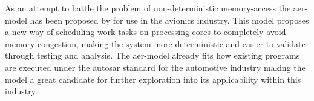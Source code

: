 \documentclass{kththesis}
\begin{document}

As an attempt to battle the problem of non-deterministic memory-access the \acrfull{aer}-model has
been proposed by \textcite{durrieu_predictable_2014} for use in the avionics industry. This model
proposes a new way of scheduling work-tasks on processing cores to completely avoid memory
congestion, making the system more deterministic and easier to validate through testing and
analysis. The \acrshort{aer}-model already fits how existing programs are executed under the
\acrfull{autosar} standard for the automotive industry making the model a great candidate for
further exploration into its applicability within this industry.


\end{document}
